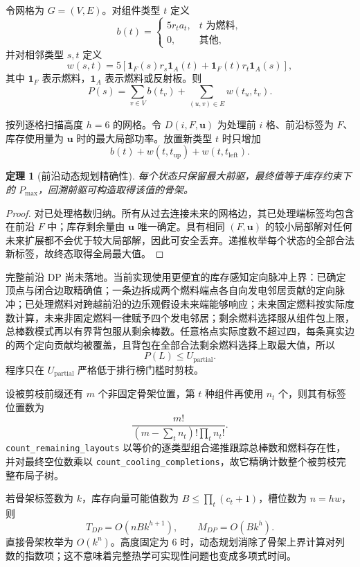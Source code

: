\documentclass[UTF8,11pt]{ctexart}
\newtheorem{theorem}[definition]{定理}
\begin{document}
令网格为 $G=(V,E)$。对组件类型 $t$ 定义
\[
b(t)=
\begin{cases}
5r_ta_t,&t\text{ 为燃料},\\
0,&\text{其他},
\end{cases}
\]
并对相邻类型 $s,t$ 定义
\[
w(s,t)=5\left[
\mathbf{1}_F(s)r_s\mathbf{1}_A(t)+
\mathbf{1}_F(t)r_t\mathbf{1}_A(s)
\right],
\]
其中 $\mathbf{1}_F$ 表示燃料，$\mathbf{1}_A$ 表示燃料或反射板。则
\[
P(s)=\sum_{v\in V}b(t_v)+\sum_{(u,v)\in E}w(t_u,t_v).
\]

按列逐格扫描高度 $h=6$ 的网格。令 $D(i,F,\mathbf u)$ 为处理前 $i$ 格、前沿标签为 $F$、库存使用量为 $\mathbf u$ 时的最大局部功率。放置新类型 $t$ 时只增加
\[
b(t)+w(t,t_{\mathrm{up}})+w(t,t_{\mathrm{left}}).
\]

\begin{theorem}[前沿动态规划精确性]
每个状态只保留最大前驱，最终值等于库存约束下的 $P_{\max}$，回溯前驱可构造取得该值的骨架。
\end{theorem}

\begin{proof}
对已处理格数归纳。所有从过去连接未来的网格边，其已处理端标签均包含在前沿 $F$ 中；库存剩余量由 $\mathbf u$ 唯一确定。具有相同 $(F,\mathbf u)$ 的较小局部解对任何未来扩展都不会优于较大局部解，因此可安全丢弃。递推枚举每个状态的全部合法新标签，故终态取得全局最大值。
\end{proof}

完整前沿 DP 尚未落地。当前实现使用更便宜的库存感知定向脉冲上界：已确定顶点与闭合边取精确值；一条边拆成两个燃料端点各自向发电邻居贡献的定向脉冲；已处理燃料对跨越前沿的边乐观假设未来端能够响应；未来固定燃料按实际度数计算，未来非固定燃料一律赋予四个发电邻居；剩余燃料选择服从组件包上限，总棒数模式再以有界背包服从剩余棒数。任意格点实际度数不超过四，每条真实边的两个定向贡献均被覆盖，且背包在全部合法剩余燃料选择上取最大值，所以
\[
P(L)\le U_{\mathrm{partial}}.
\]
程序只在 $U_{\mathrm{partial}}$ 严格低于排行榜门槛时剪枝。

设被剪枝前缀还有 $m$ 个非固定骨架位置，第 $t$ 种组件再使用 $n_t$ 个，则其有标签位置数为
\[
\frac{m!}{(m-\sum_t n_t)!\prod_t n_t!}.
\]
\texttt{count\_remaining\_layouts} 以等价的逐类型组合递推跟踪总棒数和燃料存在性，并对最终空位数乘以 \texttt{count\_cooling\_completions}，故它精确计数整个被剪枝完整布局子树。

若骨架标签数为 $k$，库存向量可能值数为 $B\le\prod_t(c_t+1)$，槽位数为 $n=hw$，则
\[
T_{DP}=O(nBk^{h+1}),
\qquad
M_{DP}=O(Bk^h).
\]
直接骨架枚举为 $O(k^n)$。高度固定为 6 时，动态规划消除了骨架上界计算对列数的指数项；这不意味着完整热学可实现性问题也变成多项式时间。
\end{document}

